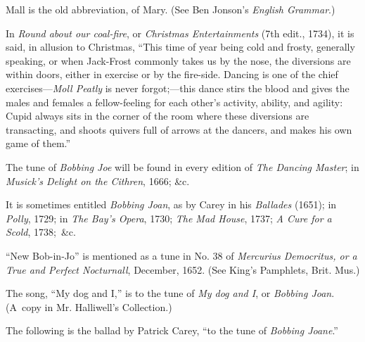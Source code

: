 Mall is the old abbreviation, of Mary. (See Ben Jonson’s \textit{English Grammar}.)

In \textit{Round about our coal-fire}, or \textit{Christmas Entertainments} (7th edit., 1734), it
is said, in allusion to Christmas, \pagebreak “This time of year being cold and frosty,
generally speaking, or when Jack-Frost commonly takes us by the nose, the
diversions are within doors, either in exercise or by the fire-side. Dancing is one
of the chief exercises—\textit{Moll Peatly} is never forgot;—this dance stirs the blood
and gives the males and females a fellow-feeling for each other’s activity, ability,
and agility: Cupid always sits in the corner of the room where these diversions
are transacting, and shoots quivers full of arrows at the dancers, and makes his
own game of them.”


\smallskip




The tune of \textit{Bobbing Joe} will be found in every edition of \textit{The Dancing Master};
in \textit{Musick's Delight on the Cithren}, 1666; \&c.

It is sometimes entitled \textit{Bobbing Joan}, as by Carey in his \textit{Ballades} (1651); in
\textit{Polly}, 1729; in \textit{The Bay's Opera}, 1730; \textit{The Mad House}, 1737; \textit{A Cure for a
Scold}, 1738;~\&c.
\pagebreak

“New Bob-in-Jo” is mentioned as a tune in No. 38 of \textit{Mercurius Democritus,
or a True and Perfect Nocturnall}, December, 1652. (See King’s Pamphlets,
Brit. Mus.)

The song, “My dog and I,” is to the tune of \textit{My dog and I}, or \textit{Bobbing Joan}.
(A~copy in Mr. Halliwell’s Collection.)

The following is the ballad by Patrick Carey, “to the tune of \textit{Bobbing Joane}.”



